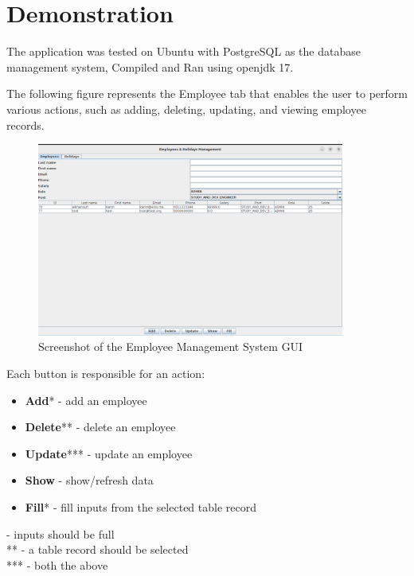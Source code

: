 \documentclass[12pt]{article}
\begin{document}
\pagebreak

\section{Demonstration}

The application was tested on Ubuntu with PostgreSQL as the
database management system, Compiled and Ran using openjdk 17.

\vspace{0.6cm}

The following figure represents the Employee tab that enables
the user to perform various actions, such as adding, deleting,
updating, and viewing employee records.

\begin{figure}[H]
  \centering
  \includegraphics[width=0.9\textwidth]{employee_preview.png}
  \caption{Screenshot of the Employee Management System GUI}
\end{figure}

Each button is responsible for an action:

\begin{itemize}
    \item \textbf{Add}* - add an employee
    \item \textbf{Delete}** - delete an employee
    \item \textbf{Update}*** - update an employee
    \item \textbf{Show} - show/refresh data
    \item \textbf{Fill}* - fill inputs from the selected table record
\end{itemize}

\noindent * - inputs should be full\\
** - a table record should be selected\\
*** - both the above
\end{document}
